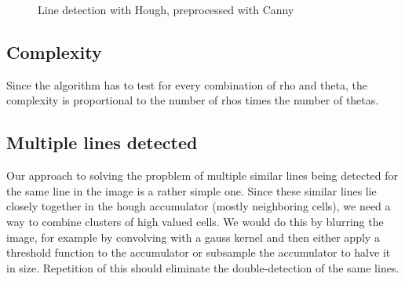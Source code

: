 \documentclass[11pt,a4paper]{article}
\begin{document}
\begin{figure}
\quad
{}
\quad
\caption{Line detection with Hough, preprocessed with Canny}%
\label{fig:a2d}%
\end{figure}

\subsection{Complexity}
Since the algorithm has to test for every combination of rho and theta, the complexity is proportional to the number of rhos times the number of thetas.

\subsection{Multiple lines detected}
Our approach to solving the propblem of multiple similar lines being detected for the same line in the image is a rather simple one. Since these similar lines lie closely together in the hough accumulator (mostly neighboring cells), we need a way to combine clusters of high valued cells. We would do this by blurring the image, for example by convolving with a gauss kernel and then either apply a threshold function to the accumulator or subsample the accumulator to halve it in size. Repetition of this should eliminate the double-detection of the same lines.
\end{document}
